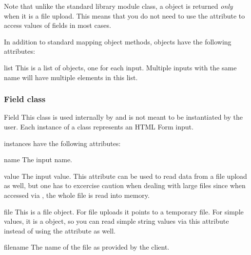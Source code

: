 Note that unlike the standard library  module
 class, a
 object is returned \emph{only} when it is a file
upload. This means that you do not need to use the 
attribute to access values of fields in most cases.

In addition to standard mapping object methods,  objects
have the following attributes:

\begin{memberdesc}{list}
This is a list of  objects, one for each input. Multiple
inputs with the same name will have multiple elements in this list.
\end{memberdesc}

\subsubsection{Field class\label{pyapi-util-fstor-fld}}

\begin{classdesc}{Field}{}
This class is used internally by  and is not
meant to be instantiated by the user. Each instance of a 
class represents an HTML Form input.
\end{classdesc}

 instances have the following attributes:

\begin{memberdesc}{name}
The input name.
\end{memberdesc}

\begin{memberdesc}{value}
The input value. This attribute can be used to read data from a file
upload as well, but one has to excercise caution when dealing with
large files since when accessed via , the whole file is
read into memory.
\end{memberdesc}

\begin{memberdesc}{file}
This is a file object. For file uploads it points to a temporary file.
For simple values, it is a  object, so you can read
simple string values via this attribute instead of using the 
attribute as well.
\end{memberdesc}

\begin{memberdesc}{filename}
The name of the file as provided by the client.
\end{memberdesc}

